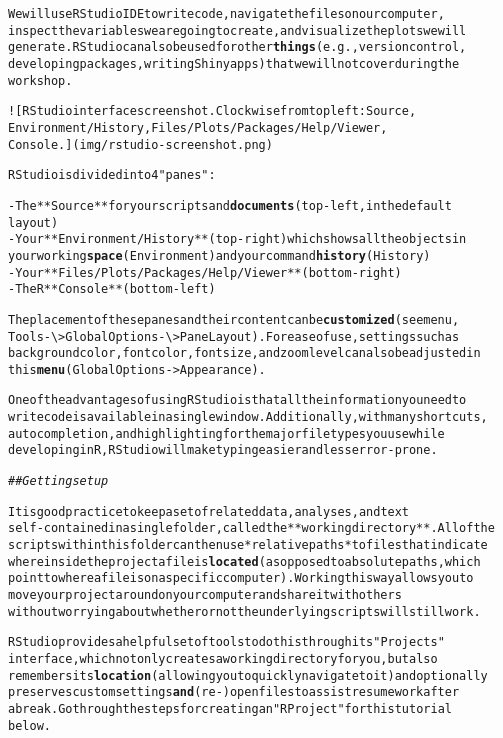\documentclass{article}\usepackage[]{graphicx}\usepackage[]{xcolor}
\makeatletter
\newcommand{\hlstr}[1]{\textcolor[rgb]{0.192,0.494,0.8}{#1}}%
\newcommand{\hlcom}[1]{\textcolor[rgb]{0.678,0.584,0.686}{\textit{#1}}}%
\newcommand{\hlkwd}[1]{\textcolor[rgb]{0.737,0.353,0.396}{\textbf{#1}}}%
\newenvironment{kframe}{%
 \def\at@end@of@kframe{}%
 \ifinner\ifhmode%
  \def\at@end@of@kframe{\end{minipage}}%
  \begin{minipage}{\columnwidth}%
 \fi\fi%
 \def\FrameCommand##1{\hskip\@totalleftmargin \hskip-\fboxsep
 \colorbox{shadecolor}{##1}\hskip-\fboxsep
     \hskip-\linewidth \hskip-\@totalleftmargin \hskip\columnwidth}%
 \MakeFramed {\advance\hsize-\width
   \@totalleftmargin\z@ \linewidth\hsize
   \@setminipage}}%
 {\par\unskip\endMakeFramed%
 \at@end@of@kframe}
\newenvironment{knitrout}{}{} %
\makeatother
\begin{document}
\begin{knitrout}
\begin{kframe}
\begin{alltt}
We will use RStudio IDE to write code, navigate the files on our computer,
inspect the variables we are going to create, and visualize the plots we will
generate. RStudio can also be used for other \hlkwd{things} (e.g., version control,
developing packages, writing Shiny apps) that we will not cover during the
workshop.

![RStudio interface screenshot. Clockwise from top left: Source,
Environment/History, Files/Plots/Packages/Help/Viewer,
Console.](img/rstudio-screenshot.png)

RStudio is divided into 4 \hlstr{"panes"}:

-   The **Source** for your scripts and \hlkwd{documents} (top-left, in the default
    layout)
-   Your **Environment/History** (top-right) which shows all the objects in
    your working \hlkwd{space} (Environment) and your command \hlkwd{history} (History)
-   Your **Files/Plots/Packages/Help/Viewer** (bottom-right)
-   The R **Console** (bottom-left)

The placement of these panes and their content can be \hlkwd{customized} (see menu,
Tools -\textbackslash{}> Global Options -\textbackslash{}> Pane Layout). For ease of use, settings such as
background color, font color, font size, and zoom level can also be adjusted in
this \hlkwd{menu} (Global Options -> Appearance).

One of the advantages of using RStudio is that all the information you need to
write code is available in a single window. Additionally, with many shortcuts,
autocompletion, and highlighting for the major file types you use while
developing in R, RStudio will make typing easier and less error-prone.

\hlcom{## Getting set up}

It is good practice to keep a set of related data, analyses, and text
self-contained in a single folder, called the **working directory**. All of the
scripts within this folder can then use *relative paths* to files that indicate
where inside the project a file is \hlkwd{located} (as opposed to absolute paths, which
point to where a file is on a specific computer). Working this way allows you to
move your project around on your computer and share it with others
without worrying about whether or not the underlying scripts will still work.

RStudio provides a helpful set of tools to do this through its \hlstr{"Projects"}
interface, which not only creates a working directory for you, but also
remembers its \hlkwd{location} (allowing you to quickly navigate to it) and optionally
preserves custom settings \hlkwd{and} (re-)open files to assist resume work after
a break. Go through the steps for creating an \hlstr{"R Project"} for this tutorial
below.


\end{alltt}
\end{kframe}
\end{knitrout}
\end{document}
